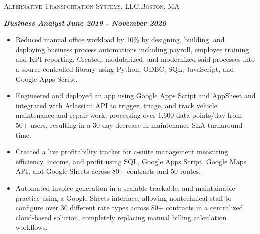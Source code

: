 \documentclass[a4paper]{article}
\newcommand{\jobtitle} [1] {
    {\hspace*{-18pt} \textsc{#1}}

}
\begin{document}
\jobtitle{Alternative Transportation Systems, LLC.\hfill Boston, MA}
\hspace*{-16pt}\textit{\textbf{Business Analyst}} \hfill \textbf{\textit{June 2019 - November 2020}}\\
\vspace{-1mm}
\begin{itemize}[leftmargin=10pt,align=left] \itemsep 1pt
    \vspace{-1.5mm} \item
        Reduced manual office workload by 10\% by designing, building, and deploying business process automations including payroll,
        employee training, and KPI reporting. Created, modularized, and modernized said processes into a source controlled library using
        Python, ODBC, SQL, JavaScript, and Google Apps Script.
    \vspace{-1.5mm} \item
        Engineered and deployed an app using Google Apps Script and AppSheet and integrated with Atlassian API to trigger, triage, and
        track vehicle maintenance and repair work, processing over 1,600 data points/day from 50+ users, resulting in a 30 day decrease in
        maintenance SLA turnaround time.
    \vspace{-1.5mm} \item
        Created a live profitability tracker for c-suite management measuring efficiency, income, and profit using SQL, Google Apps Script,
        Google Maps API, and Google Sheets across 80+ contracts and 50 routes.
    \vspace{-1.5mm} \item
        Automated invoice generation in a scalable trackable, and maintainable practice using a Google Sheets interface, allowing nontechnical
        staff to configure over 30 different rate types across 80+ contracts in a centralized cloud-based solution, completely replacing manual
        billing calculation workflows.
\end{itemize}
\end{document}
